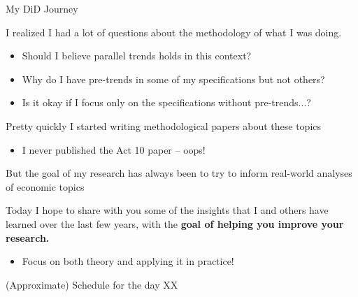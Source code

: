 \documentclass[usenames, dvipsnames, aspectratio = 169, 13pt]{beamer}
\newenvironment{wideitemize}{\itemize\addtolength{\itemsep}{10pt}}{\enditemize}
\begin{document}
\begin{frame}{My DiD Journey}
    \begin{wideitemize}
        \item
        I realized I had a lot of questions about the methodology of what I was doing.
            \begin{itemize}
                \item
                Should I believe parallel trends holds in this context? 
                
                \item
                Why do I have pre-trends in some of my specifications but not others? 
                
                \item
                Is it okay if I focus only on the specifications without pre-trends...? 
            \end{itemize}
        
        \pause    
        \item Pretty quickly I started writing methodological papers about these topics
            \begin{itemize}
                \item 
                I never published the Act 10 paper -- oops!
            \end{itemize}
            
        \item But the goal of my research has always been to try to inform real-world analyses of economic topics
        
        \pause
        \item Today I hope to share with you some of the insights that I and others have learned over the last few years, with the \textbf{goal of helping you improve your research.} 
            \begin{itemize}
                \item 
                Focus on both theory and applying it in practice!
            \end{itemize}
        
    \end{wideitemize}    
\end{frame}


\begin{frame}{(Approximate) Schedule for the day}
    XX
\end{frame}
\end{document}
